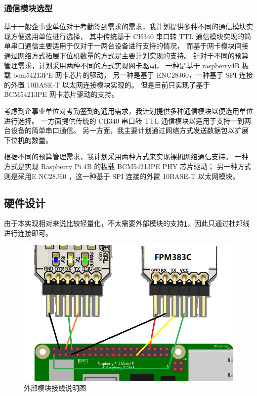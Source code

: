 \subsubsection{通信模块选型}

    基于一般企事业单位对于考勤签到需求的需求，我计划提供多种不同的通信模块实现方便选用单位进行选择，
    其中传统基于 CH340 串口转 TTL 通信模块实现的简单串口通信主要适用于仅对于一两台设备进行支持的情况，
    而基于网卡模块间接通过网络方式拓展下位机数量的方式是主要计划实现的支持。
    针对于不同的预算管理需求，计划采用两种不同的方式实现网卡驱动，
    一种是基于 raspberry4B 板载 bcm54213PE 网卡芯片的驱动，
    另一种是基于 ENC28J60，一种基于 SPI 连接的外置 10BASE-T 以太网连接模块实现的。
    但是目前只实现了基于 BCM54213PE 网卡芯片驱动的支持。

    考虑到企事业单位对考勤签到的通用需求，我计划提供多种通信模块以便选用单位进行选择。
    一方面提供传统的 CH340 串口转 TTL 通信模块以适用于支持一到两台设备的简单串口通信。
    另一方面，我主要计划通过网络方式发送数据包以扩展下位机的数量。

    根据不同的预算管理需求，我计划采用两种方式来实现裸机网络通信支持。
    一种方式是实现 Raspberry Pi 4B 的板载 BCM54213PE PHY 芯片驱动；
    另一种方式则是采用E NC28J60 ，这一种基于 SPI 连接的外置 10BASE-T 以太网模块。

\subsection{硬件设计}

    由于本实现相对来说比较轻量化，不太需要外部模块的支持\ref{外部模块接线图}，因此只通过杜邦线进行连接即可。

    \begin{figure}[ht]
    \centering
    \caption{外部模块接线说明图}    \label{外部模块接线图}
    \includegraphics[scale=0.6]{imgs/接线图.png}
    \end{figure}

